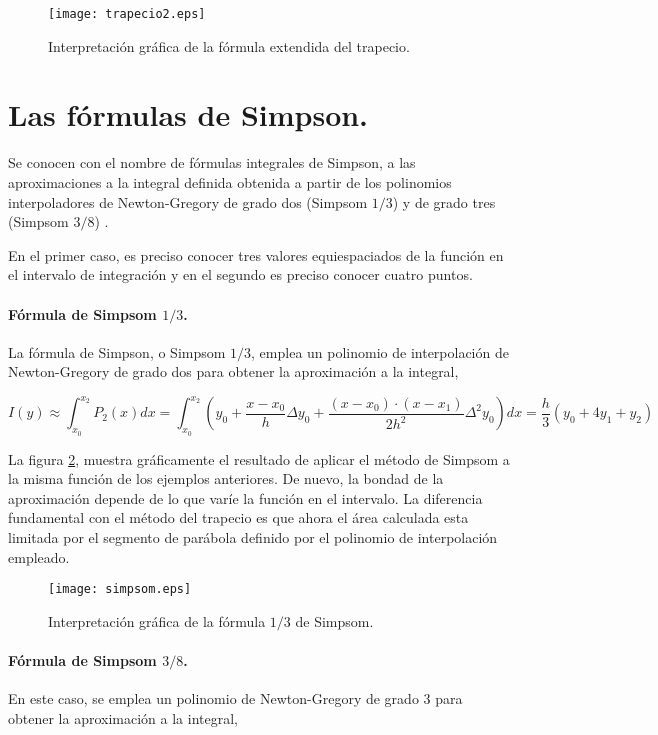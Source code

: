\begin{figure}[h]
\centering
\texttt{[image: trapecio2.eps]}
\caption{Interpretación gráfica de la fórmula extendida del trapecio.} 
\label{fig:trapecio2}
\end{figure}

\section{Las fórmulas de Simpson.}
Se conocen con el nombre de fórmulas integrales de Simpson, a las aproximaciones a la integral definida obtenida a partir de los polinomios interpoladores de Newton-Gregory de grado dos (Simpsom $1/3$) y de grado tres (Simpsom $3/8$) . 

En el primer caso, es preciso conocer tres valores equiespaciados de la función en el intervalo de integración y en el segundo es preciso conocer cuatro puntos. 

\paragraph*{Fórmula de Simpsom $1/3$.} La fórmula de Simpson, o Simpsom $1/3$,  emplea un polinomio de interpolación de Newton-Gregory de grado dos para  obtener la aproximación a la integral,

\begin{equation*}
I(y)\approx \int_{x_0}^{x_2}P_2(x)dx=\int_{x_0}^{x_2}\left(y_0+\frac{x-x_0}{h}\Delta y_0+\frac{(x-x_0)\cdot(x-x_1)}{2h^2}\Delta^2 y_0 \right)dx= \frac{h}{3}(y_0+4y_1+y_2)
\end{equation*}

La figura \ref{fig:simpsom}, muestra gráficamente el resultado de aplicar el método de Simpsom a la misma función de los ejemplos anteriores.  De nuevo, la bondad de la aproximación depende de lo que varíe la función en el intervalo.  La diferencia fundamental con el método del trapecio es que ahora el área calculada esta limitada por el segmento de parábola definido por el polinomio de interpolación empleado.

\begin{figure}[h]
\centering
\texttt{[image: simpsom.eps]}
\caption{Interpretación gráfica de la fórmula $1/3$ de Simpsom.} 
\label{fig:simpsom}
\end{figure}

\paragraph*{Fórmula de Simpsom $3/8$.} En este caso, se emplea un polinomio de Newton-Gregory de grado 3 para obtener la aproximación a la integral,

